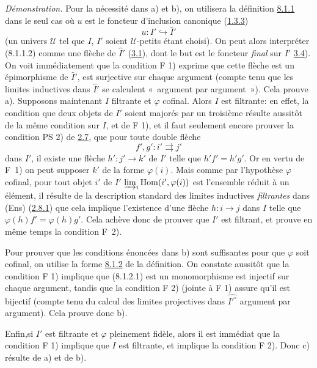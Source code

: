 \documentclass[10pt]{../fichiers-configuration-latex/smfart}
\begin{document}
\noindent \emph{Démonstration.} Pour la nécessité dans a) et b), on
utilisera la définition \hyperref[I.def8.1.1]{8.1.1} dans le seul cas où $u$ est le
foncteur d'inclusion canonique (\hyperref[I.sec1.3.3]{1.3.3})
$$
u:I'\hookrightarrow \widehat{I}'
$$
(un univers $𝒰$ tel que $I$, $I'$ soient $𝒰$-petits
étant choisi). On peut alors interpréter (8.1.1.2)
comme une flèche
de $\widehat{I}'$ (\hyperref[I.prop3.1]{3.1}), dont le but est le foncteur\pageoriginale
\emph{final} sur $I'$ \hyperref[I.prop3.4]{3.4}). On voit immédiatement que
la condition
     F 1) exprime que cette flèche est un épimorphisme de
$\widehat{I}'$, \ie est surjective sur chaque argument (compte tenu
que les limites inductives dans $\widehat{I}'$ se calculent « argument par argument »). Cela prouve a). Supposons maintenant $I$
filtrante et $\varphi$ cofinal. Alors $I$ est filtrante: en effet,
la condition que deux objets de $I'$ soient majorés par un troisième
résulte aussitôt de la même condition sur $I$, et de F 1), et il
faut seulement encore prouver la condition PS 2) de \hyperref[I.def2.7]{2.7}, \ie que
pour toute double flèche
$$
f',g':i'\rightrightarrows j'
$$
dans $I'$, il existe une flèche $h':j'\rightarrow k'$ de $I'$ telle
que $h'f'=h'g'$. Or en vertu de F~1) on peut supposer $k'$ de la
forme $\varphi(i)$. Mais comme par l'hypothèse $\varphi$ cofinal,
pour tout objet $i'$ de $I'$\; $\varinjlim_i\operatorname{Hom}(i',\varphi(i))$ est
l'ensemble réduit à un élément, il résulte de la description
standard des limites inductives \emph{filtrantes} dans (Ens) (\hyperref[I.lem2.8.1]{2.8.1})
que cela implique l'existence d'une flèche $h:i\rightarrow j$ dans
$I$ telle que $\varphi(h)f'=\varphi(h)g'$. Cela achève donc de
prouver que $I'$ est filtrant, et prouve en même temps la condition
F~2).

Pour prouver que les conditions énoncées dans b) sont suffisantes
pour que $\varphi$ soit cofinal, on utilise la forme \hyperref[I.sec8.1.2]{8.1.2} de la
définition. On constate aussitôt que la condition F 1) implique que
(8.1.2.1) est un monomorphisme \ie est injectif sur chaque argument,
tandis que la condition F 2) (jointe à F 1) assure qu'il est
bijectif (compte tenu du calcul des limites projectives dans
$\widehat{{I'}^\circ}$ argument par argument). Cela prouve donc b).

Enfin,\pageoriginale si $I'$ est filtrante et $\varphi$ pleinement
fidèle, alors il est immédiat que la condition F 1) implique que $I$
est filtrante, et implique la condition F 2). Donc c) résulte de a)
et de b).

\setcounter{subsubsection}{3}
\end{document}
